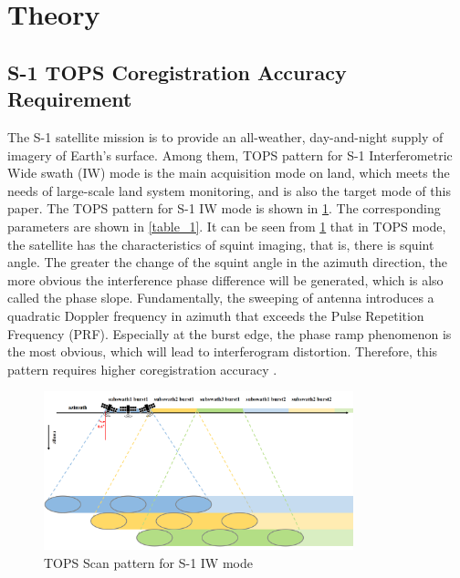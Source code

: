 \documentclass[preprint, authoryear]{elsarticle}
\begin{document}
\section{Theory}
\label{sec:2}

\subsection{S-1 TOPS Coregistration Accuracy Requirement}
The S-1 satellite mission is to provide an all-weather, day-and-night supply of imagery of Earth’s surface. Among them, TOPS pattern for S-1 Interferometric Wide swath (IW) mode is the main acquisition mode on land, which meets the needs of large-scale land system monitoring, and is also the target mode of this paper. The TOPS pattern for S-1 IW mode is shown in \ref{fig_1}. The corresponding parameters are shown in \ref{table_1}. It can be seen from \ref{fig_1} that in TOPS mode, the satellite has the characteristics of squint imaging, that is, there is squint angle. The greater the change of the squint angle in the azimuth direction, the more obvious the interference phase difference will be generated, which is also called the phase slope. Fundamentally, the sweeping of antenna introduces a quadratic Doppler frequency in azimuth that exceeds the Pulse Repetition Frequency (PRF). Especially at the burst edge, the phase ramp phenomenon is the most obvious, which will lead to interferogram distortion. Therefore, this pattern requires higher coregistration accuracy \cite{Interferometry_with_TOPS:_coregistration_and_azimuth_shifts}. \par

\begin{figure}
	\centering 
	\includegraphics[width=0.8\textwidth]{figure/TOPS Scan pattern for S-1 IW mode.png}	
	\caption{TOPS Scan pattern for S-1 IW mode} 
	\label{fig_1}%
\end{figure}
\end{document}
